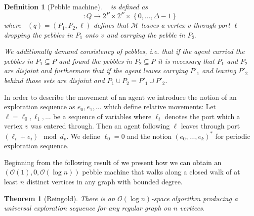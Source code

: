 \documentclass[draft,oneside]{scrartcl}
\newtheorem{thm}{Theorem}
\newtheorem{definition}{Definition}
\DeclareMathOperator{\dout}{\delta_{\mathit{out}}}
\begin{document}
\begin{definition}[Pebble machine]
  $\dout$ is defined as
  \begin{equation*}
    \dout\colon Q
    \rightarrow 2^{P}\times 2^{P}\times \left\{0,\dots,\Delta - 1\right\}
  \end{equation*}
  where $\dout(q) = (P_{1}, P_{2}, \ell)$ defines that $\mathcal{M}$ leaves
  a vertex $v$ through port $\ell$ dropping the pebbles in $P_{1}$ onto $v$
  and carrying the pebble in $P_{2}$.

  We additionally demand consistency of pebbles, i.e. that if the agent
  carried the pebbles in $P_{1}\subseteq P$ and found the pebbles in
  $P_{2}\subseteq P$ it is necessary that $P_{1}$ and $P_{2}$ are disjoint and
  furthermore that if the agent leaves carrying $P'_{1}$ and leaving $P'_{2}$
  behind those sets are disjoint and $P_{1}\cup P_{2} = P'_{1}\cup P'_{2}$.
\end{definition}

In order to describe the movement of an agent we introduce the notion of an
exploration sequence as $e_{0}, e_{1},\dots$ which define relative movements:
Let $\ell = \ell_{0},\ell_{1},\dots$ be a sequence of variables where
$\ell_{i}$ denotes the port which a vertex $v$ was entered through. Then an
agent following $\ell$ leaves through port
$(\ell_{i} + e_{i}) \mod d_{v}$. We define $\ell_{0} = 0$ and the notion
$(e_{0},\dots,e_{k})^{\ast}$ for periodic exploration sequence.

Beginning from the following result of \cite{logspacealg} we present how we can
obtain an $(\mathcal{O}(1),0,\mathcal{O}(\log n))$ pebble machine that walks
along a closed walk of at least $n$ distinct vertices in any graph with bounded
degree.
\begin{thm}[Reingold]
  \label{thm:logalg}
  There is an $\mathcal{O}(\log n)$-space algorithm producing a universal
  exploration sequence for any regular graph on $n$ vertices.
\end{thm}
\end{document}
